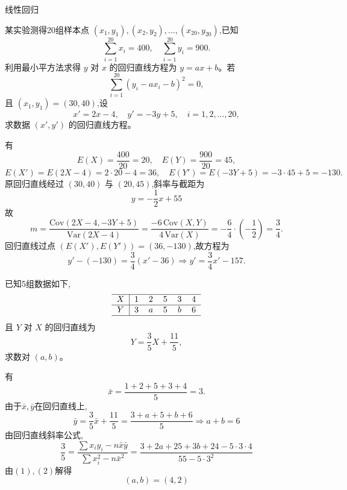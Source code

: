 \pagebreak

\begin{center}
  {\fontsize{30pt}{26pt}\selectfont
    \hypertarget{线性回归}{线性回归} \label{线性回归}
  }
\end{center}
\separator
\vspace{1pt}
\begin{questions}
    \question 某实验测得20组样本点 $(x_1,y_1), (x_2,y_2), \dots, (x_{20},y_{20})$,已知
    \[
    \sum_{i=1}^{20} x_i = 400, \quad \sum_{i=1}^{20} y_i = 900.
    \]
    利用最小平方法求得 $y$ 对 $x$ 的回归直线方程为 $y = a x + b$。若
    \[
    \sum_{i=1}^{20} (y_i - a x_i - b)^2 = 0,
    \]
    且 $(x_1,y_1) = (30,40)$,设
    \[
    x' = 2x - 4, \quad y' = -3y + 5, \quad i=1,2,\dots,20,
    \]
    求数据 $(x', y')$ 的回归直线方程。
    \begin{solution}
        有
        \[
        E(X) = \frac{400}{20} = 20, \quad E(Y) = \frac{900}{20} = 45,
        \]
        \[
        E(X') = E(2X - 4) = 2 \cdot 20 - 4 = 36, \quad E(Y') = E(-3Y + 5) = -3 \cdot 45 + 5 = -130.
        \]
        原回归直线经过 $(30,40)$ 与 $(20,45)$,斜率与截距为
        \[
        y = -\frac{1}{2} x + 55
        \]
        故
        \[
        m = \frac{\mathrm{Cov}(2X - 4, -3Y + 5)}{\mathrm{Var}(2X - 4)} = \frac{-6\,\mathrm{Cov}(X,Y)}{4\,\mathrm{Var}(X)} = -\frac{6}{4} \cdot \left(-\frac{1}{2}\right) = \frac{3}{4}.
        \]
        回归直线过点 $(E(X'), E(Y')) = (36, -130)$,故方程为
        \[
        y' - (-130) = \frac{3}{4}(x' - 36) \Rightarrow y' = \frac{3}{4} x' - 157.
        \]
    \end{solution}
    
    \question 已知5组数据如下,
    \[
    \begin{tabular}{c|ccccc}
    \hline
    $X$ & 1 & 2 & 5 & 3 & 4 \\
    \hline
    $Y$ & 3 & $a$ & 5 & $b$ & 6 \\
    \hline
    \end{tabular}
    \]
    且 $Y$ 对 $X$ 的回归直线为 
    \[
    Y = \frac{3}{5}X + \frac{11}{5},
    \]
    求数对 $(a,b)$。
    \begin{solution}
        有
        \[
        \bar x = \frac{1+2+5+3+4}{5} = 3.
        \]
        由于$\bar x,\bar y$在回归直线上,
        \[
        \bar y = \frac{3}{5} \bar x + \frac{11}{5} =\frac{3 + a + 5 + b + 6}{5} \Rightarrow a + b = 6 \tag{1}
        \]
        由回归直线斜率公式,
        \[
        \frac{3}{5} = \frac{\sum x_i y_i - n \bar x \bar y}{\sum x_i^2 - n \bar x ^2} = \frac{3+2a+25+3b+24-5 \cdot 3 \cdot 4}{55-5 \cdot 3^2} \tag{2}
        \]
        由$(1),(2)$解得
        \[
        (a,b)=(4,2)
        \]
    \end{solution}


\end{questions}
